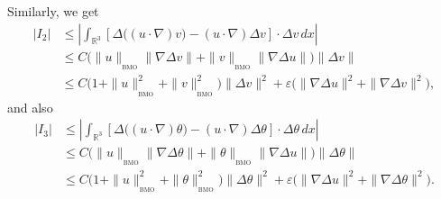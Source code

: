\documentclass[a4paper]{article}
\newcommand{\dx}{\, dx}
\newcommand{\R}{\mathbb{R}}
\begin{document}
Similarly, we get
%
\begin{equation*}
  \begin{aligned}
    |I_2| &\leq \left| \int_{\R^3}\left[\Delta \big( (u \cdot \nabla)
        v\big) - (u \cdot \nabla)\Delta v \right] \cdot \Delta v \dx
    \right|
    \\
    & \leq C\big( \|u\|_{{}_{\textrm{BMO}}}\|\nabla\Delta v\|
    +\|v\|_{{}_{\textrm{BMO}}}\|\nabla \Delta u\|\big)\|\Delta v\|
    \\
    &\leq C\big(1 + \|u\|_{{}_{\textrm{BMO}}}^2+ \|v\|_{{}_{\textrm{BMO}}}^2 \big)
    \|\Delta v\|^2 + \varepsilon \big(\|\nabla\Delta
    u\|^2+\|\nabla\Delta v\|^2 \big),
  \end{aligned}
\end{equation*}
and also
%
\begin{equation*}
  \begin{aligned}
    |I_3| &\leq \left| \int_{\R^3}\left[\Delta \big( (u \cdot \nabla)
        \theta\big) - (u \cdot \nabla)\Delta \theta \right] \cdot
      \Delta \theta \dx \right|
    \\
    & \leq C\big( \|u\|_{{}_{\textrm{BMO}}}\|\nabla\Delta \theta\|
    +\|\theta\|_{{}_{\textrm{BMO}}}\|\nabla \Delta u\|\big)\|\Delta \theta\|
    \\
    &\leq C\big(1 + \|u\|_{{}_{\textrm{BMO}}}^2+ \|\theta\|_{{}_{\textrm{BMO}}}^2 \big)
    \|\Delta \theta\|^2 + \varepsilon \big(\|\nabla\Delta
    u\|^2+\|\nabla\Delta \theta\|^2 \big).
  \end{aligned}
\end{equation*}
\end{document}
